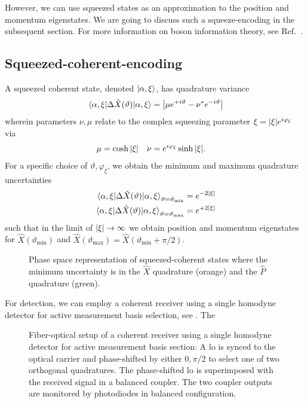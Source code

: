 However, we can use squeezed states as an approximation to the position and momentum eigenstates.
We are going to discuss such a squeeze-encoding in the subsequent section.
For more information on boson information theory, see Ref.~\cite{Weedbrook2012,Ferraro2005}.

\FloatBarrier
\subsection{Squeezed-coherent-encoding}

A squeezed coherent state, denoted $\ket{\alpha,\xi}$, has quadrature variance~\cite[p.~95]{Vogel2006}
\begin{equation}
	\expval{\Delta\hat{X}(\vartheta)}{\alpha,\xi}
	=
	\abs{\mu e^{+i\vartheta}-\nu^* e^{-i\vartheta}}
\end{equation}
wherein parameters $\nu,\mu$ relate to the complex squeezing parameter $\xi=\abs{\xi}e^{i\varphi_\xi}$ via~\cite[p.~90]{Vogel2006}
\begin{align}
	\mu
	&=
	\cosh\abs{\xi}
	&
	\nu
	&=
	e^{i\varphi_\xi}
	\sinh\abs{\xi}
	.
\end{align}
For a specific choice of $\vartheta,\varphi_\xi$, we obtain the minimum and maximum quadrature uncertainties~\cite[p.~96]{Vogel2006}
\begin{align}
	\expval{\Delta\hat{X}(\vartheta)}{\alpha,\xi}_{\vartheta=\vartheta_\text{min}}
	&=
	e^{-2\abs{\xi}}
	\\
	\expval{\Delta\hat{X}(\vartheta)}{\alpha,\xi}_{\vartheta=\vartheta_\text{max}}
	&=
	e^{+2\abs{\xi}}
\end{align}
such that in the limit of $\abs{\xi}\to\infty$ we obtain position and momentum eigenstates for $\hat{X}(\vartheta_\text{min})$ and $\hat{X}(\vartheta_\text{max})=\hat{X}(\vartheta_\text{min}+\pi/2)$.
\begin{figure}[htb]
	\centering
	
	\caption{Phase space representation of squeezed-coherent states where the minimum uncertainty is in the $\hat{X}$ quadrature (orange) and the $\hat{P}$ quadrature (green).}
\end{figure}
For detection, we can employ a coherent receiver using a single homodyne detector for active measurement basis selection, see .
The 
\begin{figure}[htb]
	\centering
	
	\caption{Fiber-optical setup of a coherent receiver using a single homodyne detector for active measurement basis section: A \gls{lo} is synced to the optical carrier and phase-shifted by either $0,\pi/2$ to select one of two orthogonal quadratures. The phase-shifted \gls{lo} is superimposed with the received signal in a balanced coupler. The two coupler outputs are monitored by photodiodes in balanced configuration.}\label{fig:coherent_receiver_active}
\end{figure}

